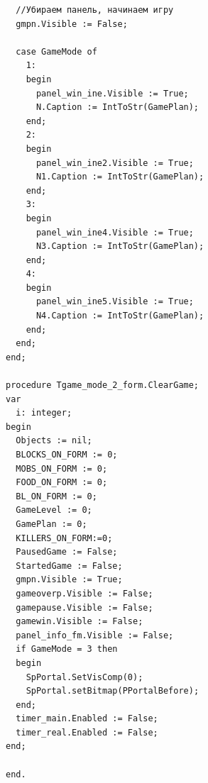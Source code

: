 \documentclass[a4paper,14pt]{extarticle}
\begin{document}
\begin{verbatim}
  //Убираем панель, начинаем игру
  gmpn.Visible := False;

  case GameMode of
    1:
    begin
      panel_win_ine.Visible := True;
      N.Caption := IntToStr(GamePlan);
    end;
    2:
    begin
      panel_win_ine2.Visible := True;
      N1.Caption := IntToStr(GamePlan);
    end;
    3:
    begin
      panel_win_ine4.Visible := True;
      N3.Caption := IntToStr(GamePlan);
    end;
    4:
    begin
      panel_win_ine5.Visible := True;
      N4.Caption := IntToStr(GamePlan);
    end;
  end;
end;

procedure Tgame_mode_2_form.ClearGame;
var
  i: integer;
begin
  Objects := nil;
  BLOCKS_ON_FORM := 0;
  MOBS_ON_FORM := 0;
  FOOD_ON_FORM := 0;
  BL_ON_FORM := 0;
  GameLevel := 0;
  GamePlan := 0;
  KILLERS_ON_FORM:=0;
  PausedGame := False;
  StartedGame := False;
  gmpn.Visible := True;
  gameoverp.Visible := False;
  gamepause.Visible := False;
  gamewin.Visible := False;
  panel_info_fm.Visible := False;
  if GameMode = 3 then
  begin
    SpPortal.SetVisComp(0);
    SpPortal.setBitmap(PPortalBefore);
  end;
  timer_main.Enabled := False;
  timer_real.Enabled := False;
end;

end.
\end{verbatim}
\end{document}
